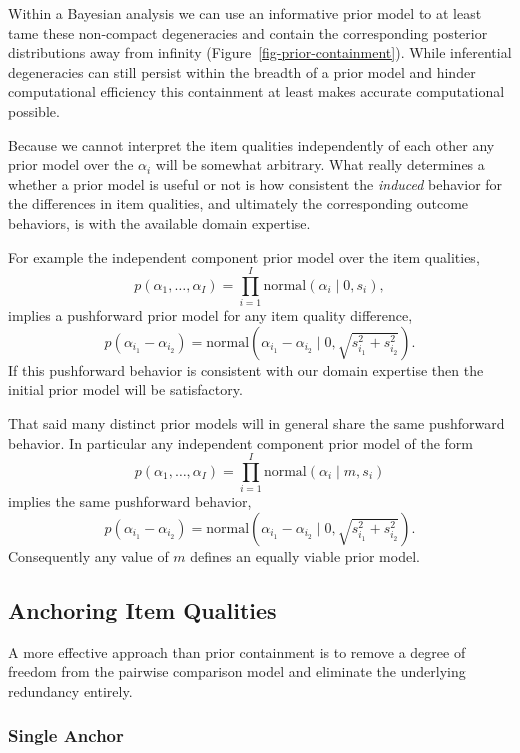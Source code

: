 \documentclass[
  letterpaper,
  DIV=11,
  numbers=noendperiod]{scrartcl}
\begin{document}
Within a Bayesian analysis we can use an informative prior model to at
least tame these non-compact degeneracies and contain the corresponding
posterior distributions away from infinity
(Figure~\ref{fig-prior-containment}). While inferential degeneracies can
still persist within the breadth of a prior model and hinder
computational efficiency this containment at least makes accurate
computational possible.

Because we cannot interpret the item qualities independently of each
other any prior model over the \(\alpha_{i}\) will be somewhat
arbitrary. What really determines a whether a prior model is useful or
not is how consistent the \emph{induced} behavior for the differences in
item qualities, and ultimately the corresponding outcome behaviors, is
with the available domain expertise.

For example the independent component prior model over the item
qualities, \[
p( \alpha_{1}, \ldots, \alpha_{I} )
=
\prod_{i = 1}^{I} \text{normal}( \alpha_{i} \mid 0, s_{i} ),
\] implies a pushforward prior model for any item quality difference, \[
p( \alpha_{i_{1}} - \alpha_{i_{2}} )
=
\text{normal} \left( \alpha_{i_{1}} - \alpha_{i_{2}} \mid
                     0, \sqrt{ s_{i_{1}}^{2} + s_{i_{2}}^{2} } \right).
\] If this pushforward behavior is consistent with our domain expertise
then the initial prior model will be satisfactory.

That said many distinct prior models will in general share the same
pushforward behavior. In particular any independent component prior
model of the form \[
p( \alpha_{1}, \ldots, \alpha_{I} )
=
\prod_{i = 1}^{I} \text{normal}( \alpha_{i} \mid m, s_{i} )
\] implies the same pushforward behavior, \[
p( \alpha_{i_{1}} - \alpha_{i_{2}} )
=
\text{normal} \left( \alpha_{i_{1}} - \alpha_{i_{2}} \mid
                     0, \sqrt{ s_{i_{1}}^{2} + s_{i_{2}}^{2} } \right).
\] Consequently any value of \(m\) defines an equally viable prior
model.

\subsection{Anchoring Item Qualities}\label{anchoring-item-qualities}

A more effective approach than prior containment is to remove a degree
of freedom from the pairwise comparison model and eliminate the
underlying redundancy entirely.

\subsubsection{Single Anchor}\label{single-anchor}
\end{document}
